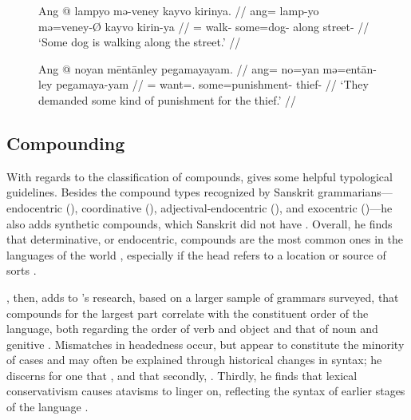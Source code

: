 \begin{figure}[h]
\pex\label{ex:menoun}
\a\begingl
	\gla Ang @ lampyo mə-veney kayvo kirinya. //
	\glb ang= lamp-yo mə=veney-Ø kayvo kirin-ya //
	\glc \AgtT{}= walk-\TsgN{} some=dog-\Top{} along street-\Loc{} //
	\glft `Some dog is walking along the street.' //
\endgl

\a\begingl
	\gla Ang @ noyan mēntānley pegamayayam. //
	\glb ang= no=yan mə=entān-ley pegamaya-yam //
	\glc \AgtT{}= want=\TsgM{}.\Top{} some=punishment-\PargI{} 
		thief-\Dat{} //
	\glft `They demanded some kind of punishment for the thief.' //
\endgl
\xe
\end{figure}


\subsection{Compounding}
\label{subsec:compounds}

With regards to the classification of compounds, \citet{bauer2001} gives some 
helpful typological guidelines. Besides the compound types recognized by 
Sanskrit grammarians---endocentric (), coordinative 
(), adjectival-endo\-cent\-ric (), and 
exocentric ()---he also adds synthetic compounds, which Sanskrit 
did not have \citep[697]{bauer2001}. Overall, he finds that determinative, or 
endocentric, compounds are the most common ones in the languages of the world 
\citep[697]{bauer2001}, especially if the head refers to a location or source 
of sorts \citep[702]{bauer2001}.

\citet{gaeta2008}, then, adds to \citet{bauer2001}'s research, based on a
larger sample of grammars surveyed, that compounds for the largest part
correlate with the constituent order of the language, both regarding the order
of verb and object and that of noun and genitive \citep[129--133]{gaeta2008}.
Mismatches in headedness occur, but appear to constitute the minority of cases
and may often be explained through historical changes in syntax; he discerns
for one that , and that secondly, . Thirdly, he
finds that lexical conservativism causes atavisms to linger on, reflecting the
syntax of earlier stages of the language \citep[138--139]{gaeta2008}.

